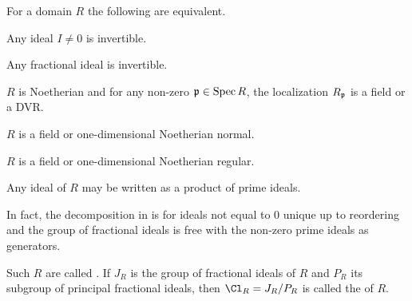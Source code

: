 \documentclass[a4paper,parskip=half,numbers=enddot, DIV=12]{scrreprt}
\begin{document}
\begin{thm}
    For a domain $R$ the following are equivalent.
    \begin{alphanumerate}
    \item 
        Any ideal $I\neq 0$ is invertible.
    \item 
        Any fractional ideal is invertible.
    \item 
        $R$ is Noetherian and for any non-zero $\mathfrak{p}\in\operatorname{Spec} R$, the localization $R_{\mathfrak{p}}$ is a field or a DVR.
    \item 
        $R$ is a field or one-dimensional Noetherian normal.
    \item
        $R$ is a field or one-dimensional Noetherian regular.
    \item 
        Any ideal of $R$ may be written as a product of prime ideals.
    \end{alphanumerate}
    In fact, the decomposition in  is for ideals not equal to $0$ unique up to reordering and the group of fractional ideals is free with the non-zero prime ideals as generators.
\end{thm}
\begin{defi}
    Such $R$ are called . If $J_R$ is the group of fractional ideals of $R$ and $P_R$ its subgroup of principal fractional ideals, then  $\Cl_R = J_R/P_R$ is called the  of $R$.
\end{defi}
\end{document}
